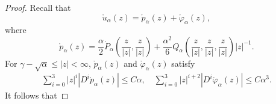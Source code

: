 \documentclass[11pt,letterpaper]{amsart}
\theoremstyle{definition}
\theoremstyle{remark}
\numberwithin{equation}{section}
\begin{document}
\begin{proof}
    Recall that 
    \begin{equation*}
        \mathring{u}_{\alpha}(z)=\mathring{p}_{\alpha}(z)+\mathring{\varphi}_{\alpha}(z),
    \end{equation*}
    where 
\begin{equation*}
    \mathring{p}_{\alpha}(z)=\frac{\alpha}{2}\mathring{P}_{\alpha}\left(\frac{z}{|z|},\frac{z}{|z|} \right)+\frac{\alpha^2}{6}{Q}_{\alpha}\left(\frac{z}{|z|},\frac{z}{|z|},\frac{z}{|z|} \right)|z|^{-1}.
\end{equation*}    
For $\gamma-\sqrt{\alpha}\leq |z|<\infty$, $\mathring{p}_{\alpha}(z)$ and $\mathring{\varphi}_{\alpha}(z)$ satisfy
\begin{equation}\label{apriori-estimate-u}
    \begin{split}
        \sum_{i=0}^{3} |z|^{i}|D^{i}\mathring{p}_{\alpha}(z)|\leq C\alpha,\quad \sum_{i=0}^{3} |z|^{i+2}|D^{i}\mathring{\varphi}_{\alpha}(z)|\leq C\alpha^3.
    \end{split}
\end{equation}
It follows that


\end{proof}
\end{document}
